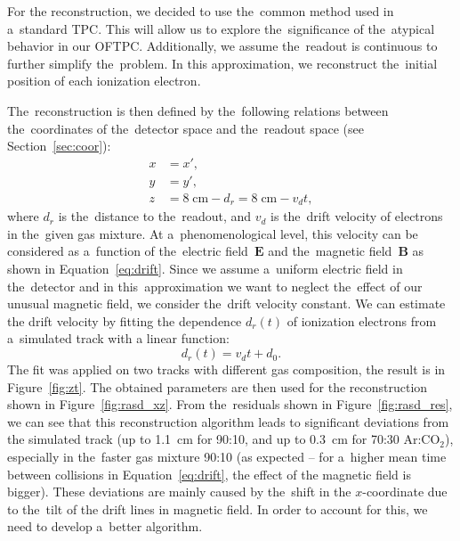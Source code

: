 		For the reconstruction, we decided to use the~common method used in a~standard \ac{TPC}. This will allow us to explore the~significance of the~atypical behavior in our \ac{OFTPC}. Additionally, we assume the~readout is continuous to further simplify the~problem. In this approximation, we reconstruct the~initial position of each ionization electron.
		
		The~reconstruction is then defined by the~following relations between the~coordinates of the~detector space and the~readout space (see Section~\ref{sec:coor}):
			\begin{align}
				x &= x',\\
				y &= y',\\
				z &= 8\;\text{cm} - d_r = 8\;\text{cm} - v_d t,
			\end{align}
		where $d_r$ is the~distance to the~readout, and $v_d$ is the~drift velocity of electrons in the~given gas mixture. At a~phenomenological level, this velocity can be considered as a~function of the~electric field~$\bm{E}$ and the~magnetic field~$\bm{B}$ as shown in Equation~\ref{eq:drift}. Since we assume a~uniform electric field in the~detector and in this~approximation we want to neglect the~effect of our unusual magnetic field, we consider the~drift velocity constant. We can estimate the drift velocity by fitting the dependence $d_r(t)$ of ionization electrons from a~simulated track with a linear function:
			\begin{equation}
				d_r(t) = v_d t + d_0.
			\end{equation}
		The fit was applied on two tracks with different gas composition, the result is in Figure~\ref{fig:zt}. The obtained parameters are then used for the reconstruction shown in Figure~\ref{fig:rasd_xz}. From the~residuals shown in Figure~\ref{fig:rasd_res}, we can see that this reconstruction algorithm leads to significant deviations from the simulated track (up to 1.1~cm for 90:10, and up to 0.3~cm for 70:30 Ar:CO$_2$), especially in the~faster gas mixture 90:10 (as expected -- for a~higher mean time between collisions in Equation~\ref{eq:drift}, the effect of the magnetic field is bigger). These deviations are mainly caused by the~shift in the $x$\nobreakdash-coordinate due to the~tilt of the drift lines in magnetic field. In order to account for this, we need to develop a~better algorithm.
		

